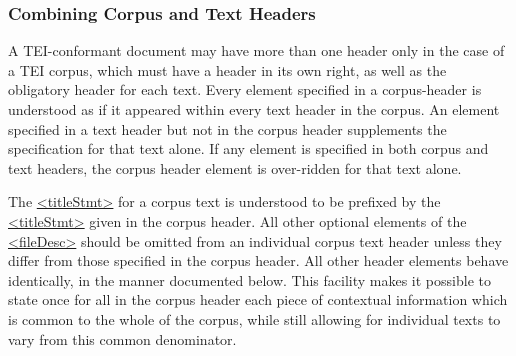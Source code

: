 \subsubsection[{Combining Corpus and Text Headers}]{Combining Corpus and Text Headers}\label{CCAS1}\par
A TEI-conformant document may have more than one header only in the case of a TEI corpus, which must have a header in its own right, as well as the obligatory header for each text. Every element specified in a corpus-header is understood as if it appeared within every text header in the corpus. An element specified in a text header but not in the corpus header supplements the specification for that text alone. If any element is specified in both corpus and text headers, the corpus header element is over-ridden for that text alone. \par
The \hyperref[TEI.titleStmt]{<titleStmt>} for a corpus text is understood to be prefixed by the \hyperref[TEI.titleStmt]{<titleStmt>} given in the corpus header. All other optional elements of the \hyperref[TEI.fileDesc]{<fileDesc>} should be omitted from an individual corpus text header unless they differ from those specified in the corpus header. All other header elements behave identically, in the manner documented below. This facility makes it possible to state once for all in the corpus header each piece of contextual information which is common to the whole of the corpus, while still allowing for individual texts to vary from this common denominator.\par
